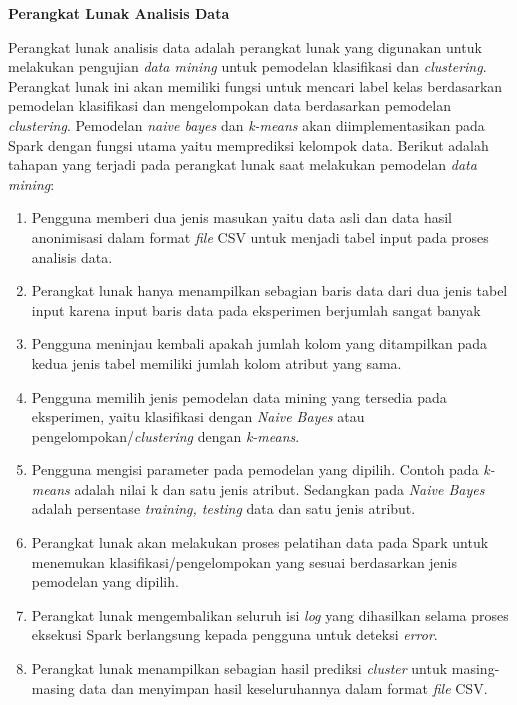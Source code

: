 \documentclass[a4paper,twoside]{article}
\begin{document}
\begin{enumerate}
\textbf{Perangkat Lunak Analisis Data}

Perangkat lunak analisis data adalah perangkat lunak yang digunakan untuk melakukan pengujian \textit{data mining} untuk pemodelan klasifikasi dan \textit{clustering}. Perangkat lunak ini akan memiliki fungsi untuk mencari label kelas berdasarkan pemodelan klasifikasi dan mengelompokan data berdasarkan pemodelan \textit{clustering}. Pemodelan \textit{naive bayes} dan \textit{k-means} akan diimplementasikan pada Spark dengan fungsi utama yaitu memprediksi kelompok data. Berikut adalah tahapan yang terjadi pada perangkat lunak saat melakukan pemodelan \textit{data mining}:

\begin{enumerate}

\item Pengguna memberi dua jenis masukan yaitu data asli dan data hasil anonimisasi dalam format \textit{file} CSV untuk menjadi tabel input pada proses analisis data.

\item Perangkat lunak hanya menampilkan sebagian baris data dari dua jenis tabel input karena input baris data pada eksperimen berjumlah sangat banyak 

\item Pengguna meninjau kembali apakah jumlah kolom yang ditampilkan pada kedua jenis tabel memiliki jumlah kolom atribut yang sama.

\item Pengguna memilih jenis pemodelan data mining yang tersedia pada eksperimen, yaitu klasifikasi dengan \textit{Naive Bayes} atau pengelompokan/\textit{clustering} dengan \textit{k-means}. 

\item Pengguna mengisi parameter pada pemodelan yang dipilih. Contoh pada \textit{k-means} adalah nilai k dan satu jenis atribut. Sedangkan pada \textit{Naive Bayes} adalah persentase \textit{training, testing} data dan satu jenis atribut.

\item Perangkat lunak akan melakukan proses pelatihan data pada Spark untuk menemukan klasifikasi/pengelompokan yang sesuai berdasarkan jenis pemodelan yang dipilih.

\item Perangkat lunak mengembalikan seluruh isi \textit{log} yang dihasilkan selama proses eksekusi Spark berlangsung kepada pengguna untuk deteksi \textit{error}.

\item Perangkat lunak menampilkan sebagian hasil prediksi \textit{cluster} untuk masing-masing data dan menyimpan hasil keseluruhannya dalam format \textit{file} CSV.


\end{enumerate}
\end{enumerate}
\end{document}
